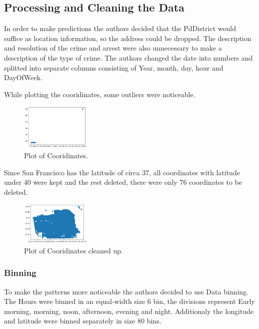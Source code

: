 \documentclass[../Main.tex]{subfiles}
\begin{document}
\subsection{Processing and Cleaning the Data}
In order to make predictions the authors decided that the PdDistrict would suffice as location information, so the address could be dropped. The description and resolution of the crime and arrest were also unnecessary to make a description of the type of crime.
The authors changed the date into numbers and splitted into separate columns consisting of Year, month, day, hour and DayOfWeek.

While plotting the cooridinates, some outliers were noticeable.

\begin{figure}[H]
\centering
\includegraphics[width=0.3\textwidth]{Resources/PlotCooridinates.png}
\caption{\label{fig:PlotCooridinates}Plot of Cooridinates.}
\end{figure}

Since San Francisco has the latitude of circa 37, all coordinates with latitude under 40 were kept and the rest deleted, there were only 76 coordinates to be deleted. 

\begin{figure}[H]
\centering
\includegraphics[width=0.3\textwidth]{Resources/CleanedCoordinates.png}
\caption{\label{fig:CleanedCoordinates}Plot of Cooridinates cleaned up.}
\end{figure}

\subsubsection{Binning}
To make the patterns more noticeable the authors decided to use Data binning. 
The Hours were binned in an equal-width size 6 bin, the divisions represent Early morning, morning, noon, afternoon, evening and night.
Additionaly the longitude and latitude were binned separately in size 80 bins.
\end{document}
